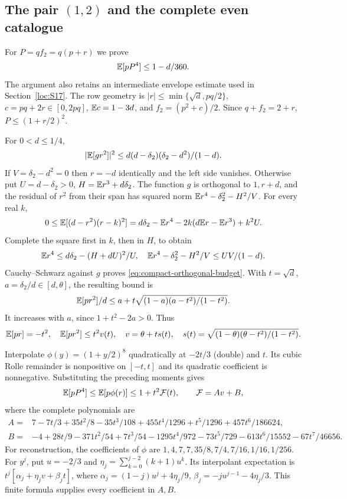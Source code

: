 \subsection[The pair (1,2) and the complete even catalogue]{The pair $(1,2)$ and the complete even catalogue}\label{loc:S13}
For $P=qf_2=q(p+r)$ we prove
\begin{equation}\label{eq:compact-P12-fourth}
 \mathbb E[pP^4]\le1-d/360.
\end{equation}
The argument also retains an intermediate envelope estimate used in
Section~\ref{loc:S17}.
The row geometry is $|r|\le\min\{\sqrt d,pq/2\}$,
$c=pq+2r\in[0,2pq]$, $\mathbb E c=1-3d$, and $f_2=(p^2+c)/2$.
Since $q+f_2=2+r$, $P\le(1+r/2)^2$.

For $0<d\le1/4$,
\begin{equation}\label{eq:compact-orthogonal-budget}
 |\mathbb E[gr^2]|^2\le d(d-\delta_{2})(\delta_{2}-d^2)/(1-d).
\end{equation}
If $V=\delta_{2}-d^2=0$ then $r=-d$ identically and the left side vanishes.
Otherwise put $U=d-\delta_{2}>0$, $H=\mathbb E r^3+d\delta_{2}$.
The function $g$ is orthogonal to $1,r+d$, and the residual of $r^2$
from their span has squared norm $\mathbb E r^4-\delta_{2}^2-H^2/V$.
For every real $k$,
\[
 0\le\mathbb E[(d-r^2)(r-k)^2]
 =d\delta_{2}-\mathbb E r^4-2k(d\mathbb E r-\mathbb E r^3)+k^2U.
\]
Complete the square first in $k$, then in $H$, to obtain
\[
 \mathbb E r^4\le d\delta_{2}-(H+dU)^2/U,\quad
 \mathbb E r^4-\delta_{2}^2-H^2/V\le UV/(1-d).
\]
Cauchy--Schwarz against $g$ proves \eqref{eq:compact-orthogonal-budget}.
With $t=\sqrt d$, $a=\delta_{2}/d\in[d,\theta]$, the resulting bound is
\[
 \mathbb E[pr^2]/d\le a+t\sqrt{(1-a)(a-t^2)/(1-t^2)}.
\]
It increases with $a$, since $1+t^2-2a>0$. Thus
\begin{gather*}
 \mathbb E[pr]=-t^2,\quad\mathbb E[pr^2]\le t^2v(t),\quad
 v=\theta+ts(t),\quad
 s(t)=\sqrt{(1-\theta)(\theta-t^2)/(1-t^2)}.
\end{gather*}

Interpolate $\phi(y)=(1+y/2)^8$ quadratically at $-2t/3$ (double) and $t$.
Its cubic Rolle remainder is nonpositive on $[-t,t]$ and its quadratic
coefficient is nonnegative. Substituting the preceding moments gives
\begin{equation}\label{eq:compact-P12-aux}
 \mathbb E[pP^4]\le\mathbb E[p\phi(r)]\le1+t^2\mathcal F(t),\qquad
 \mathcal F=Av+B,
\end{equation}
where the complete polynomials are
\begin{align*}
 A={}&7-7t/3+35t^2/8-35t^3/108+455t^4/1296+t^5/1296+457t^6/186624,\\
 B={}&-4+28t/9-371t^2/54+7t^3/54-1295t^4/972
                     -73t^5/729-613t^6/15552-67t^7/46656.
\end{align*}
For reconstruction, the coefficients of $\phi$ are
$1,4,7,7,35/8,7/4,7/16,1/16,1/256$.
For $y^j$, put $u=-2/3$ and
$\eta_j=\sum_{k=0}^{j-2}(k+1)u^k$.
Its interpolant expectation is
$t^j[\alpha_j+\eta_jv+\beta_jt]$, where
$\alpha_j=(1-j)u^j+4\eta_j/9$,
$\beta_j=-ju^{j-1}-4\eta_j/3$.
This finite formula supplies every coefficient in $A,B$.

